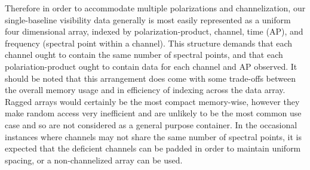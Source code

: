 Therefore in order to accommodate multiple polarizations and channelization, our single-baseline visibility data generally is most easily represented as a uniform four dimensional array, indexed by polarization-product, channel, time (AP), and frequency (spectral point within a channel). This structure demands that each channel ought to contain the same number of spectral points,
and that each polariation-product ought to contain data for each channel and AP observed. It should be noted that this arrangement does come with some trade-offs between the overall memory usage and in efficiency of indexing across the data array. Ragged arrays would certainly be the most compact memory-wise, however they make random access very inefficient and are unlikely to be the most common use case and so are not considered as a general purpose container. In the occasional instances where channels may not share the same number of spectral points, it is expected that the deficient channels can be padded in order to maintain uniform spacing, or a non-channelized array 
can be used.

